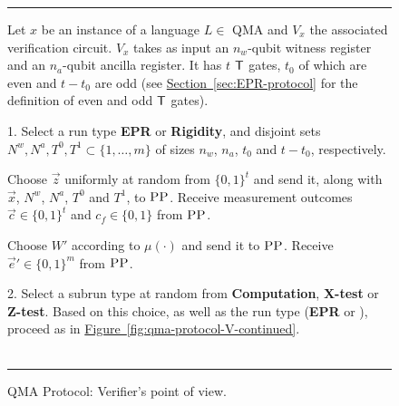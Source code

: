 \documentclass[11pt]{article}
\numberwithin{equation}{section}
\theoremstyle{definition}
\theoremstyle{plain}
\newcommand{\expref}[2]{\hyperref[#2]{#1~\ref{#2}}}
\newcommand{\pp}{\textsc{PP}}
\begin{document}
\begin{figure}[H]
\rule[1ex]{\textwidth}{0.5pt}
\vspace{-20pt}
\justify
Let $x$ be an instance of a language $L \in$ QMA and $V_x$ the associated verification circuit. $V_x$ takes as input  an $n_w$-qubit witness register and an $n_a$-qubit ancilla register. It has $t$ $\sf T$ gates, $t_0$ of which are even and $t-t_0$ are odd (see \expref{Section}{sec:EPR-protocol} for the definition of even and odd $\sf T$ gates).

\justify
\vspace{-0.25cm}   %
1. Select a run type \textbf{EPR} or \textbf{Rigidity}, and disjoint sets
  $N^w,N^a, T^0,T^1\subset \{1,\ldots,m\}$ of sizes $n_w$, $n_a$,  $t_0$ and $t-t_0$, respectively.  %
\begin{description}
\setlength\itemsep{-0.17em}   %
\item[EPR] Choose $\vec{z}$ uniformly at random from $\{0,1\}^t$ and send it,
  along with $\vec{x}$, $N^w$, $N^a$, $T^0$ and $T^1$, to $\pp$. Receive measurement outcomes $\vec{c}\in\{0,1\}^t$ and $c_f\in\{0,1\}$ from $\pp$.
\item[Rigidity] Choose $W'$ according to $\mu(\cdot)$ and send it to $\pp$. Receive $\vec{e}'\in \{0,1\}^m$ from $\pp$. 
\end{description}
\vspace{-0.17cm}    %
2. Select a subrun type at random from \textbf{Computation}, \textbf{X-test} or \textbf{Z-test}. Based on this choice, as well as the run type (\textbf{EPR} or ), proceed as in 
%
%
\expref{Figure}{fig:qma-protocol-V-continued}. \\   %
~\\    %
\rule[2ex]{\textwidth}{0.5pt}\vspace{-.5cm}  %
\caption{QMA Protocol: Verifier's point of view.}\label{fig:qma-protocol-V}
\end{figure}
\end{document}
